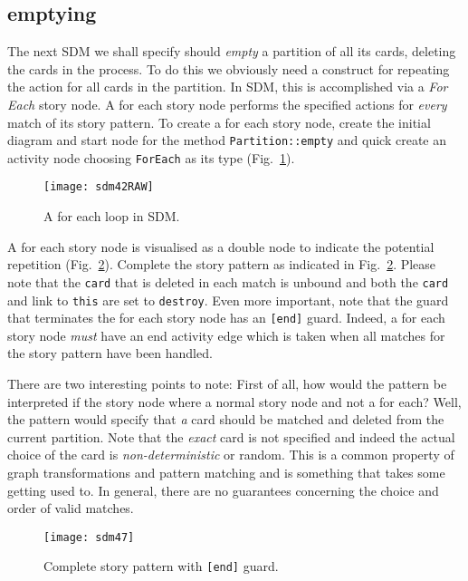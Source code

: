 \newpage
\subsection{emptying}

The next SDM we shall specify should \emph{empty} a partition of all its cards, deleting the cards in the process. To do this we obviously need a construct for
repeating the action for all cards in the partition. In SDM, this is  accomplished via a \emph{For Each} story node. A for each story node
performs the specified actions for \emph{every} match of its story pattern. To create a for each story node, create the initial diagram and start node for the
method \texttt{Partition::empty} and quick create an activity node choosing \texttt{ForEach} as its type (Fig.~\ref{fig:sdm_foreach}).

\begin{figure}[htbp]
\begin{center}
  \texttt{[image: sdm42RAW]}
  \caption{A for each loop in SDM.}  
  \label{fig:sdm_foreach}
\end{center}
\end{figure}

A for each story node is visualised as a double node to indicate the potential repetition (Fig.~\ref{fig:sdm_end}).  Complete the story pattern as indicated in
Fig.~\ref{fig:sdm_end}.   Please note that the \texttt{card} that is deleted in each match is unbound and both the \texttt{card} and link to \texttt{this} are
set to \texttt{destroy}. Even more important, note that the guard that terminates the for each story node has an \texttt{[end]} guard. Indeed, a for each story
node \emph{must} have an end activity edge which is taken when all matches for the story pattern have been handled.

There are two interesting points to note: First of all, how would the pattern be interpreted if the story node where a normal story node and not a for each?
   Well, the pattern would specify that \emph{a} card should be matched and deleted from the current partition. Note that the \emph{exact}
card is not specified and indeed the actual choice of the card is \emph{non-deterministic} or random.  This is a common property of graph transformations and
pattern matching and is something that takes some getting used to.  In general, there are no guarantees concerning the choice and order of valid matches.

\begin{figure}[htbp]
\begin{center}
  \texttt{[image: sdm47]}
  \caption{Complete story pattern with \texttt{[end]} guard.}  
  \label{fig:sdm_end}
\end{center}
\end{figure}

